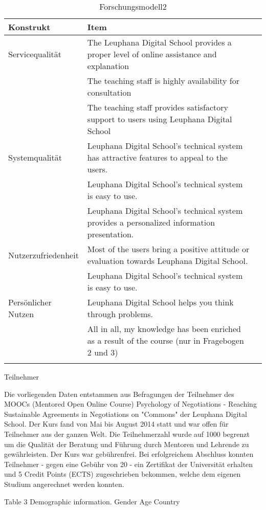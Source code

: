 \begin{table}[ht] 
\caption{Forschungsmodell2}
\label{tab:Forschungsmodell} 
\begin{tabular}{@{}llr@{}} \toprule

\textbf{Konstrukt} & \textbf{Item} \\ \midrule

Servicequalität & \parbox[t]{12cm}{The Leuphana Digital School provides a proper level of online assistance and explanation} \\ \addlinespace
& The teaching staff is highly availability for consultation\\\addlinespace
& \parbox[t]{12cm}{The teaching staff provides satisfactory support to users using Leuphana Digital School} \\ \addlinespace
Systemqualität & \parbox[t]{12cm}{Leuphana Digital School’s technical system has attractive features to appeal to the users.}\\ \addlinespace
& Leuphana Digital School’s technical system is easy to use. \\\addlinespace
& \parbox[t]{12cm}{Leuphana Digital School’s technical system provides a personalized information presentation.} \\ \addlinespace
Nutzerzufriedenheit & \parbox[t]{12cm}{Most of the users bring a positive attitude or evaluation towards Leuphana Digital School.} \\ \addlinespace
& Leuphana Digital School’s technical system is easy to use.  \\ \addlinespace 
Persönlicher Nutzen & \parbox[t]{12cm}{Leuphana Digital School helps you think through problems.} \\ \addlinespace 
& \parbox[t]{12cm}{All in all, my knowledge has been enriched as a result of the course (nur in Fragebogen 2 und 3)} \\ \addlinespace 
  \bottomrule

\end{tabular}	
\end{table}

Teilnehmer


Die vorliegenden Daten entstammen aus Befragungen der Teilnehmer des MOOCs (Mentored Open Online Course) Psychology of Negotiations - Reaching Sustainable Agreements in Negotiations on "Commons" der Leuphana Digital School. Der Kurs fand von Mai bis August 2014 statt und war offen für Teilnehmer aus der ganzen Welt. Die Teilnehmerzahl wurde auf 1000 begrenzt um die Qualität der Beratung und Führung durch Mentoren und Lehrende zu gewährleisten. Der Kurs war gebührenfrei. Bei erfolgreichem Abschluss konnten   Teilnehmer - gegen eine Gebühr von 20 	\texteuro - ein Zertifikat der Universität erhalten und 5 Credit Points (ECTS) zugeschrieben bekommen, welche dem eigenen Studium angerechnet werden konnten.   


Table 3
Demographic information.
Gender
Age
Country



